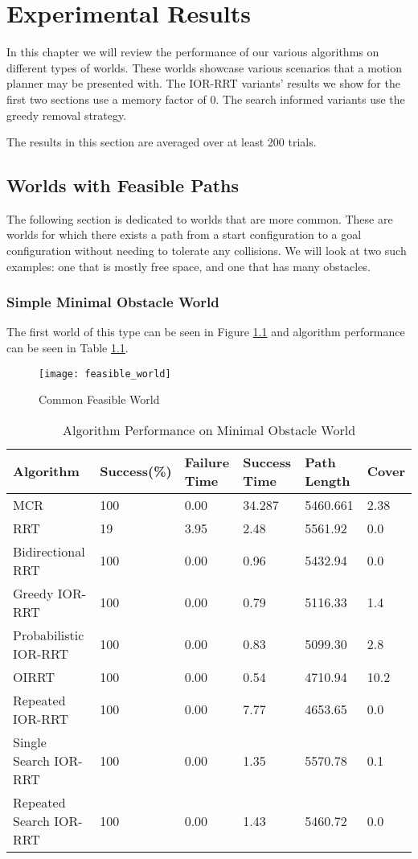 \chapter{Experimental Results}
In this chapter we will review the performance of our various algorithms on different types of worlds. These worlds showcase various scenarios that a motion planner may be presented with. The IOR-RRT variants' results we show for the first two sections use a memory factor of 0. The search informed variants use the greedy removal strategy. 

The results in this section are averaged over at least 200 trials.
\section{Worlds with Feasible Paths}
The following section is dedicated to worlds that are more common. These are worlds for which there exists a path from a start configuration to a goal configuration without needing to tolerate any collisions. We will look at two such examples: one that is mostly free space, and one that has many obstacles.

\subsection{Simple Minimal Obstacle World}
The first world of this type can be seen in Figure \ref{fig:feasible_world} and algorithm performance can be seen in Table \ref{tab:feasible_world}. 

\begin{figure}[h!]
    \centering
    \texttt{[image: feasible\_world]}
    \caption{Common Feasible World}
    \label{fig:feasible_world}
\end{figure}

\begin{table}[h!]
\begin{tabular}{@{}llllll@{}}
\toprule
Algorithm & Success(\%)  & Failure Time  & Success Time  & Path Length & Cover\\ 
\midrule
MCR & 100 & 0.00 & 34.287 & 5460.661 & 2.38 \\
RRT & 19 & 3.95 & 2.48 & 5561.92 & 0.0 \\ 
Bidirectional RRT & 100 & 0.00 & 0.96 & 5432.94 & 0.0 \\
Greedy IOR-RRT & 100 & 0.00 & 0.79 & 5116.33 & 1.4 \\
Probabilistic IOR-RRT & 100 & 0.00 & 0.83 & 5099.30 & 2.8 \\
OIRRT & 100 & 0.00 & 0.54 & 4710.94 & 10.2 \\
Repeated IOR-RRT & 100 & 0.00 & 7.77 & 4653.65 & 0.0 \\
Single Search IOR-RRT & 100 & 0.00 & 1.35 & 5570.78 & 0.1 \\
Repeated Search IOR-RRT & 100 & 0.00 & 1.43 & 5460.72 & 0.0 \\
\bottomrule
\end{tabular}
\caption{Algorithm Performance on Minimal Obstacle World}
\label{tab:feasible_world}
\end{table}

